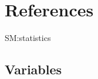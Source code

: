 \documentclass{article}
\begin{document}
\clearpage

\section{References}
\label{sec:org5442bea}

\begingroup
\renewcommand{\section}[2]{}

 
\endgroup

\clearpage

\appendix

\section{Statistics: definitions and notations}
\label{SM:statistics}
\subsection{Variables}
\label{sec:orge471522}
\end{document}
